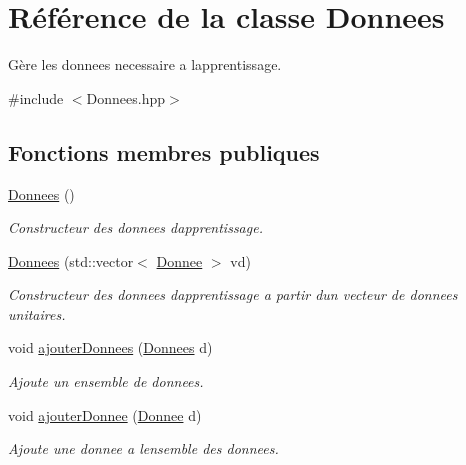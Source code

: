 \hypertarget{classDonnees}{}\section{Référence de la classe Donnees}
\label{classDonnees}


Gère les donnees necessaire a l\textquotesingle{}apprentissage.  




{\ttfamily \#include $<$Donnees.\+hpp$>$}

\subsection*{Fonctions membres publiques}
\begin{DoxyCompactItemize}
\item 
\mbox{\label{classDonnees_af6379b2712677e845cf58e37000f9b75}} 
\hyperlink{classDonnees_af6379b2712677e845cf58e37000f9b75}{Donnees} ()
\begin{DoxyCompactList}\small\item\em Constructeur des donnees d\textquotesingle{}apprentissage. \end{DoxyCompactList}\item 
\mbox{\label{classDonnees_aab4dadccfdee90d79faedaa42a3200b8}} 
\hyperlink{classDonnees_aab4dadccfdee90d79faedaa42a3200b8}{Donnees} (std\+::vector$<$ \hyperlink{classDonnee}{Donnee} $>$ vd)
\begin{DoxyCompactList}\small\item\em Constructeur des donnees d\textquotesingle{}apprentissage a partir d\textquotesingle{}un vecteur de donnees unitaires. \end{DoxyCompactList}\item 
void \hyperlink{classDonnees_a26d282aff1a7adfdcaea1a3cab6ffbaf}{ajouter\+Donnees} (\hyperlink{classDonnees}{Donnees} d)
\begin{DoxyCompactList}\small\item\em Ajoute un ensemble de donnees. \end{DoxyCompactList}\item 
void \hyperlink{classDonnees_a7f77ebe53ea55a3293cefb864d60e7ff}{ajouter\+Donnee} (\hyperlink{classDonnee}{Donnee} d)
\begin{DoxyCompactList}\small\item\em Ajoute une donnee a l\textquotesingle{}ensemble des donnees. \end{DoxyCompactList}\item 

\end{DoxyCompactItemize}
